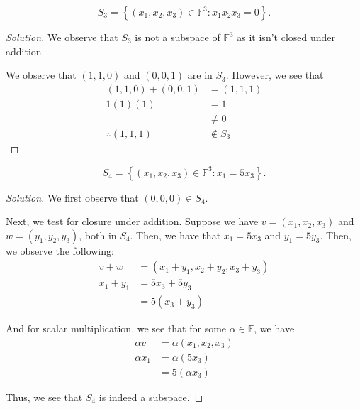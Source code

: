 \documentclass[openany]{book}
\newenvironment{solution}{\begin{proof}[Solution]}{\end{proof}}
\begin{document}
	\begin{hw}
		\begin{equation*}
			S_{3} = \left\{  (x_{1}, x_{2}, x_{3}) \in \mathbb{F}^{3} : x_{1} x_{2} x_{3} = 0\right\}.
		\end{equation*}
	\end{hw}
	\begin{solution}
		We observe that $S_{3}$ is not a subspace of $\mathbb{F}^{3}$ as it isn't closed under addition.
		
		We observe that $(1,1,0)$ and $(0,0,1)$ are in $S_{3}$. However, we see that
		\begin{align*}
			(1,1,0) + (0,0,1) &= (1,1,1) \\
			1(1)(1) &= 1 \\
			&\neq 0 \\
		\therefore	(1,1,1) &\not\in S_{3}
		\end{align*}
	\end{solution}

	\begin{hw}\label{Problem 1.21}
		\begin{equation*}
			S_{4} = \left\{  (x_{1}, x_{2}, x_{3}) \in \mathbb{F}^{3} : x_{1} = 5x_{3} \right\}.
		\end{equation*}
	\end{hw}
	\begin{solution}
		We first observe that $(0,0,0) \in S_{4}$.
		
		Next, we test for closure under addition. Suppose we have $v = (x_{1}, x_{2}, x_{3})$ and $w = (y_{1}, y_{2}, y_{3})$, both in $S_{4}$. Then, we have that $x_{1} = 5x_{3}$ and $y_{1} = 5y_{3}$. Then, we observe the following:
		\begin{align*}
			v + w &= (x_{1} + y_{1}, x_{2}+y_{2}, x_{3} +y_{3}) \\
			x_{1}+y_{1} &= 5x_{3} + 5y_{3} \\
			&= 5(x_{3} + y_{3})
		\end{align*}
	
		And for scalar multiplication, we see that for some $\alpha \in \mathbb{F}$, we have
		\begin{align*}
			\alpha v &= \alpha (x_{1}, x_{2}, x_{3}) \\
			\alpha x_{1} &= \alpha (5x_{3}) \\
			&= 5 (\alpha x_{3})
		\end{align*}
	
		Thus, we see that $S_{4}$ is indeed a subspace.
	\end{solution}
\end{document}
